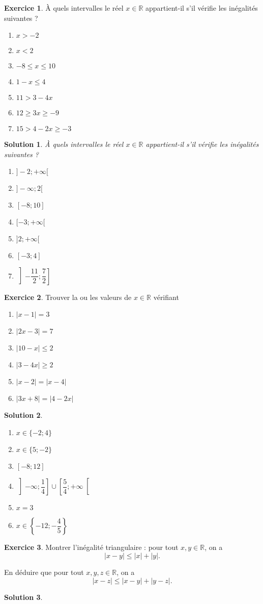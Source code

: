 \documentclass[a4paper, 14pt]{extarticle}
\theoremstyle{plain}
\newtheorem*{sol}{Solution}
\theoremstyle{definition}
\newtheorem{ex}{Exercice}
\newcommand{\R}{\mathbb{R}}
\newcommand{\exe}[2]{
		\begin{ex} #1  \end{ex}
		\begin{sol} #2 \end{sol}
	}
\newcommand{\exe}[2]{
		\begin{ex} #1  \end{ex}
	}
\begin{document}
\exe{
	À quels intervalles le réel $x \in \R$ appartient-il s'il vérifie les inégalités suivantes ?
	\begin{multicols}{2}
	\begin{enumerate}
		\item $x > -2$
		\item $x  < 2$
		\item $-8 \leq x \leq 10$
		\item $1 - x \leq 4$
		\item $ 11 > 3 - 4x  $
		\item $12 \geq 3x \geq -9$
		\item $15 > 4 - 2x \geq -3$
	\end{enumerate}
	\end{multicols}
}
{


	À quels intervalles le réel $x \in \R$ appartient-il s'il vérifie les inégalités suivantes ?
	\begin{multicols}{2}
	\begin{enumerate}
		\item $]{-}2; {+}\infty[$
		\item $]{-}\infty ; 2[$
		\item $[-{8}; 10]$
		\item $[-3 ; {+}\infty[$
		\item $]2 ; {+}\infty[$
		\item $[-3 ; 4]$
		\item $\left] -\dfrac{11}2 ; \dfrac72 \right]$
	\end{enumerate}
	\end{multicols}

}


\exe{
	Trouver la ou les valeurs de $x \in \R$ vérifiant
	\begin{multicols}{2}
	\begin{enumerate}
		\item $|x - 1| = 3$
		\item $|2x-3| = 7$
		\item $|10-x| \leq 2$
		\item $|3 - 4x| \geq 2$
		\item $|x-2| = |x-4|$
		\item $| 3x + 8| = |4 - 2x |$
	\end{enumerate}
	\end{multicols}
}
{


	\begin{multicols}{2}
	\begin{enumerate}
		\item $x \in \{-2 ; 4\}$
		\item $x \in \{5 ; -2\}$
		\item $[{-}8 ; 12]$
		\item $\left]{-}\infty ; \dfrac14\right] \cup \left[\dfrac54; {+}\infty\right[$
		\item $x = 3$
		\item $x \in \left\{-12 ; -\dfrac45\right\}$
	\end{enumerate}
	\end{multicols}


}

\exe{
	Montrer l'inégalité triangulaire : pour tout $x,y \in \R$, on a
		\[ |x -  y| \leq |x| + | y|. \]
		
	En déduire que pour tout $x,y,z \in \R$, on a
		\[ |x - z| \leq |x-y| + |y - z|. \]
}
{}
\end{document}
